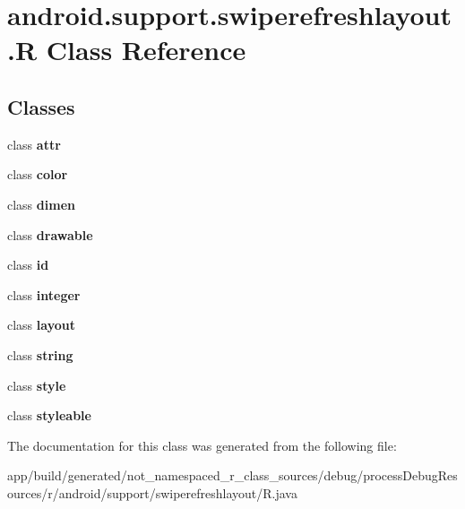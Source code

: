 \hypertarget{classandroid_1_1support_1_1swiperefreshlayout_1_1_r}{}\section{android.\+support.\+swiperefreshlayout.\+R Class Reference}
\label{classandroid_1_1support_1_1swiperefreshlayout_1_1_r}
\subsection*{Classes}
\begin{DoxyCompactItemize}
\item 
class {\bfseries attr}
\item 
class {\bfseries color}
\item 
class {\bfseries dimen}
\item 
class {\bfseries drawable}
\item 
class {\bfseries id}
\item 
class {\bfseries integer}
\item 
class {\bfseries layout}
\item 
class {\bfseries string}
\item 
class {\bfseries style}
\item 
class {\bfseries styleable}
\end{DoxyCompactItemize}


The documentation for this class was generated from the following file\+:\begin{DoxyCompactItemize}
\item 
app/build/generated/not\+\_\+namespaced\+\_\+r\+\_\+class\+\_\+sources/debug/process\+Debug\+Resources/r/android/support/swiperefreshlayout/R.\+java\end{DoxyCompactItemize}

